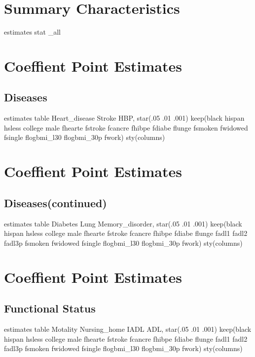 \documentclass{article}
\begin{document}
\pagebreak
\section*{\centering Summary Characteristics}

\begin{Statacode}

estimates stat _all

\end{Statacode}

\pagebreak
\section*{\centering Coeffient Point Estimates}
\subsection*{\centering Diseases}
\begin{Statacode}
estimates table Heart_disease Stroke HBP, star(.05 .01 .001) keep(black hispan hsless college male fhearte fstroke fcancre fhibpe fdiabe flunge fsmoken fwidowed fsingle flogbmi_l30 flogbmi_30p fwork) sty(columns)
\end{Statacode}

\pagebreak
\section*{\centering Coeffient Point Estimates}
\subsection*{\centering Diseases(continued)}
\begin{Statacode}
estimates table Diabetes Lung Memory_disorder, star(.05 .01 .001) keep(black hispan hsless college male fhearte fstroke fcancre fhibpe fdiabe flunge fadl1 fadl2 fadl3p fsmoken fwidowed fsingle flogbmi_l30 flogbmi_30p fwork) sty(columns)
\end{Statacode}

\pagebreak
\section*{\centering Coeffient Point Estimates}
\subsection*{\centering Functional Status}
\begin{Statacode}
estimates table Motality Nursing_home IADL ADL, star(.05 .01 .001) keep(black hispan hsless college male fhearte fstroke fcancre fhibpe fdiabe flunge fadl1 fadl2 fadl3p fsmoken fwidowed fsingle flogbmi_l30 flogbmi_30p fwork) sty(columns)
\end{Statacode}
\end{document}
